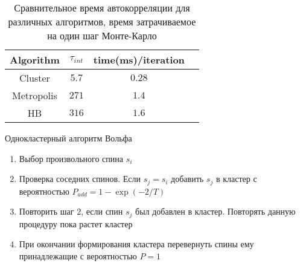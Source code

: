\documentclass{beamer}
\begin{document}
\begin{frame}
\begin{table}\caption{Сравнительное время автокорреляции для различных
алгоритмов, время затрачиваемое на один шаг Монте-Карло\footnotemark[3]}
\begin{center}
\begin{tabular}{|c|c|c|c}
\hline
   Algorithm & $\tau_{int}$ & time(ms)/iteration \\
   \hline
	Cluster & $5.7$ & $0.28$ \\
	Metropolis & $271$ & $1.4$ \\ 
	HB & $316$ & $1.6$ \\
\hline
\end{tabular}
\end{center}
\end{table}
\end{frame}

\begin{frame}{Однокластерный алгоритм Вольфа}
	\begin{enumerate}
	  \item Выбор произвольного спина $s_i$
	  \item Проверка соседних спинов. Если $s_j = s_i$  добавить $s_j$ в
	  кластер с вероятностью $P_{add} = 1 - \exp(-2/T)$  
	  \item Повторить шаг 2, если спин $s_j$ был добавлен в кластер. Повторять
	  данную процедуру пока растет кластер
	  \item При окончании формирования кластера перевернуть спины ему принадлежащие
	  с вероятностью $P = 1$
	  \end{enumerate}
\end{frame}
\end{document}
